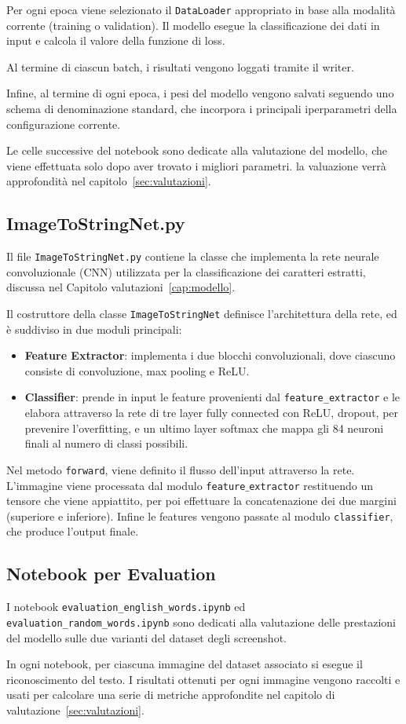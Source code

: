 Per ogni epoca viene selezionato il \texttt{DataLoader} appropriato in base alla modalità corrente (training o validation).  
Il modello esegue la classificazione dei dati in input e calcola il valore della funzione di loss.  

Al termine di ciascun batch, i risultati vengono loggati tramite il writer.

Infine, al termine di ogni epoca, i pesi del modello vengono salvati seguendo uno schema di denominazione standard, che incorpora i principali iperparametri della configurazione corrente.

Le celle successive del notebook sono dedicate alla valutazione del modello, che viene effettuata solo dopo aver trovato i migliori parametri. la valuazione verrà approfondità nel capitolo~\ref{sec:valutazioni}.

\subsection*{ImageToStringNet.py}
Il file \texttt{ImageToStringNet.py} contiene la classe che implementa la rete neurale convoluzionale (CNN) utilizzata per la classificazione dei caratteri estratti, discussa nel Capitolo valutazioni~\ref{cap:modello}. 

Il costruttore della classe \texttt{ImageToStringNet} definisce l'architettura della rete, ed è suddiviso in due moduli principali:
\begin{itemize}
    \item \textbf{Feature Extractor}: implementa i due blocchi convoluzionali, dove ciascuno consiste di convoluzione, max pooling e ReLU.
    \item \textbf{Classifier}: prende in input le feature provenienti dal \texttt{feature\_extractor} e le elabora attraverso la rete di tre layer fully connected con ReLU, dropout, per prevenire l'overfitting, e un ultimo layer softmax che mappa gli 84 neuroni finali al numero di classi possibili.
\end{itemize}

Nel metodo \texttt{forward}, viene definito il flusso dell'input attraverso la rete. L'immagine viene processata dal modulo \texttt{feature$\_$extractor} restituendo un tensore che viene appiattito, per poi effettuare la concatenazione dei due margini (superiore e inferiore). Infine le features vengono passate al modulo \texttt{classifier}, che produce l'output finale.

\subsection*{Notebook per Evaluation}
I notebook \texttt{evaluation\_english\_words.ipynb} ed \\  \texttt{evaluation\_random\_words.ipynb} sono dedicati alla valutazione delle prestazioni del modello sulle due varianti del dataset degli screenshot. 

In ogni notebook, per ciascuna immagine del dataset associato si esegue il riconoscimento del testo. I risultati ottenuti per ogni immagine vengono raccolti e usati per calcolare una serie di metriche approfondite nel capitolo di valutazione~\ref{sec:valutazioni}.
